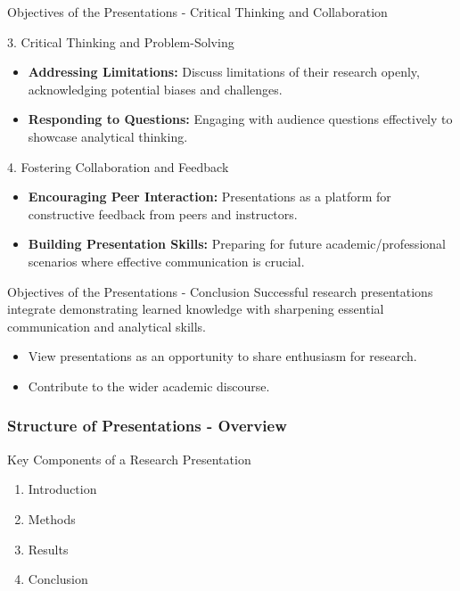 \documentclass[aspectratio=169]{beamer}
\begin{document}
\begin{frame}[fragile]{Objectives of the Presentations - Critical Thinking and Collaboration}
  \begin{block}{3. Critical Thinking and Problem-Solving}
    \begin{itemize}
      \item \textbf{Addressing Limitations:} Discuss limitations of their research openly, acknowledging potential biases and challenges.
      \item \textbf{Responding to Questions:} Engaging with audience questions effectively to showcase analytical thinking.
    \end{itemize}
  \end{block}

  \begin{block}{4. Fostering Collaboration and Feedback}
    \begin{itemize}
      \item \textbf{Encouraging Peer Interaction:} Presentations as a platform for constructive feedback from peers and instructors.
      \item \textbf{Building Presentation Skills:} Preparing for future academic/professional scenarios where effective communication is crucial.
    \end{itemize}
  \end{block}
\end{frame}

\begin{frame}[fragile]{Objectives of the Presentations - Conclusion}
  Successful research presentations integrate demonstrating learned knowledge with sharpening essential communication and analytical skills. 

  \begin{itemize}
    \item View presentations as an opportunity to share enthusiasm for research.
    \item Contribute to the wider academic discourse.
  \end{itemize}
\end{frame}

\begin{frame}[fragile]
    \frametitle{Structure of Presentations - Overview}
    \begin{block}{Key Components of a Research Presentation}
        \begin{enumerate}
            \item Introduction
            \item Methods
            \item Results
            \item Conclusion
        \end{enumerate}
    \end{block}
\end{frame}
\end{document}

